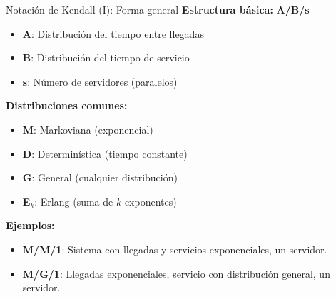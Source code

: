 \documentclass{beamer}
\begin{document}
\begin{frame}{Notación de Kendall (I): Forma general}
\textbf{Estructura básica:} \quad \textbf{A/B/s}

\vspace{0.3cm}
\begin{itemize}
    \item \textbf{A}: Distribución del tiempo entre llegadas
    \item \textbf{B}: Distribución del tiempo de servicio
    \item \textbf{s}: Número de servidores (paralelos)
\end{itemize}

\vspace{0.3cm}
\textbf{Distribuciones comunes:}
\begin{itemize}
    \item \textbf{M}: Markoviana (exponencial)
    \item \textbf{D}: Determinística (tiempo constante)
    \item \textbf{G}: General (cualquier distribución)
    \item \textbf{E$_k$}: Erlang (suma de $k$ exponentes)
\end{itemize}

\vspace{0.3cm}
\textbf{Ejemplos:}
\begin{itemize}
    \item \textbf{M/M/1}: Sistema con llegadas y servicios exponenciales, un servidor.
    \item \textbf{M/G/1}: Llegadas exponenciales, servicio con distribución general, un servidor.
\end{itemize}
\end{frame}
\end{document}

